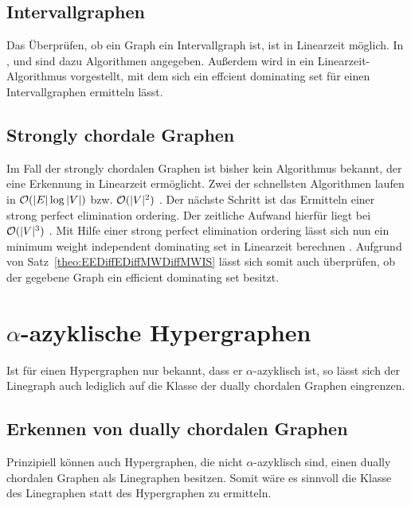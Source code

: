 \subsection{Intervallgraphen}
Das Überprüfen, ob ein Graph ein Intervallgraph ist, ist in Linearzeit möglich. In \cite{Booth1976}, \cite{Habib200059} und \cite{korte68} sind dazu Algorithmen angegeben. Außerdem wird in \cite{wipdIntervall} ein Linearzeit-Algorithmus vorgestellt, mit dem sich ein effcient dominating set für einen Intervallgraphen ermitteln lässt.

%

\subsection{Strongly chordale Graphen}
Im Fall der strongly chordalen Graphen ist bisher kein Algorithmus bekannt, der eine Erkennung in Linearzeit ermöglicht. Zwei der schnellsten Algorithmen laufen in $\mathcal{O}(|E| \log|V|)$ \cite{PaigeTarjan1987}  bzw. $\mathcal{O}(|V|^2)$  \cite{Spinrad1993229}. Der nächste Schritt ist das Ermitteln einer strong perfect elimination ordering. Der zeitliche Aufwand hierfür liegt bei $\mathcal{O}(|V|^3)$  \cite{Anstee1984}. Mit Hilfe einer strong perfect elimination ordering lässt sich nun ein minimum weight independent dominating set in Linearzeit berechnen \cite{Faber1984}. Aufgrund von Satz~\ref{theo:EEDiffEDiffMWDiffMWIS} lässt sich somit auch überprüfen, ob der gegebene Graph ein efficient dominating set besitzt.


\section{$\alpha$-azyklische Hypergraphen}
Ist für einen Hypergraphen nur bekannt, dass er $\alpha$-azyklisch ist, so lässt sich der Linegraph auch lediglich auf die Klasse der dually chordalen Graphen eingrenzen. 


\subsection{Erkennen von dually chordalen Graphen}
Prinzipiell können auch Hypergraphen, die nicht $\alpha$-azyklisch sind, einen dually chordalen Graphen als Linegraphen besitzen. Somit wäre es sinnvoll die Klasse des Linegraphen statt des Hypergraphen zu ermitteln.

